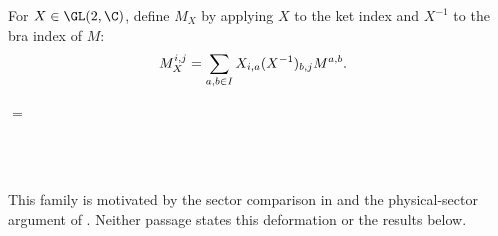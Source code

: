 \begin{definition}%
    \label{def:mpdo_bond_two_singleton_physical_deformation}
    \leanok
    For $X\in\GL(2,\C)$, define $M_X$ by applying $X$ to the ket index and
    $X^{-1}$ to the bra index of $M$:
    \begin{align}
        M_X^{i,j}
         & =\sum_{a,b\in I}X_{i,a}(X^{-1})_{b,j}M^{a,b}.
        \notag
    \end{align}
    \begin{center}
        \tenkzkernel
        \begin{tenkz}[rows={wire}, cols=1, west=open, east=open,
                physical=updown]
        \end{tenkz}
        $ = $
        \begin{tenkz}[rows={op,op,op}, cols=1, west=none, east=none,
                physical=updown]
             \\
             \\
        \end{tenkz}
    \end{center}
    This family is motivated by the sector comparison in
    \cite[Appendix~C.4, lines~2048--2057]{Cirac2016MPDO_arXiv} and the
    physical-sector argument of
    \cite[Proposition~4.13, lines~1898--1921]{Cirac2016MPDO_arXiv}.
    Neither passage states this deformation or the results below.
\end{definition}


